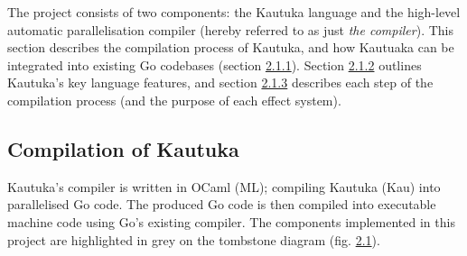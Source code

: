 The project consists of two components: the Kautuka language and the high-level automatic parallelisation compiler (hereby referred to as just \textit{the compiler}). This section describes the compilation process of Kautuka, and how Kautuaka can be integrated into existing Go codebases (section \hyperref[sec:2.1.1]{2.1.1}). Section \hyperref[sec:2.1.2]{2.1.2} outlines Kautuka's key language features, and section \hyperref[sec:2.1.3]{2.1.3} describes each step of the compilation process (and the purpose of each effect system).

\subsection{Compilation of Kautuka}

\label{sec:2.1.1}

\noindent\begin{minipage}{.5\linewidth}

  Kautuka's compiler is written in OCaml (ML); compiling Kautuka (Kau) into parallelised Go code. The produced Go code is then compiled into executable machine code using Go's existing compiler. The components implemented in this project are highlighted in grey on the tombstone diagram (fig. \hyperref[fig:tombstone]{2.1}).

\end{minipage}%
\hspace{1.5mm}\begin{minipage}{.5\linewidth}
  \hspace{3mm}
  \vspace{-3mm}
  \label{fig:tombstone}
\end{minipage}

\vspace{2mm}

